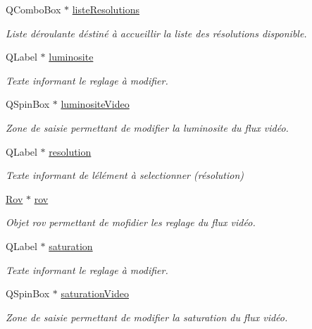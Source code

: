 \begin{DoxyCompactItemize}
Q\+Combo\+Box $\ast$ \hyperlink{class_i_h_m_reglage_video_ad897355a4350d95f5f219db57ff68d4f}{liste\+Resolutions}
\begin{DoxyCompactList}\small\item\em Liste déroulante déstiné à accueillir la liste des résolutions disponible. \end{DoxyCompactList}\item 
Q\+Label $\ast$ \hyperlink{class_i_h_m_reglage_video_a16b65877af48863d0752e226371952ab}{luminosite}
\begin{DoxyCompactList}\small\item\em Texte informant le reglage à modifier. \end{DoxyCompactList}\item 
Q\+Spin\+Box $\ast$ \hyperlink{class_i_h_m_reglage_video_a9109c0801d582917e78e57c350510ea7}{luminosite\+Video}
\begin{DoxyCompactList}\small\item\em Zone de saisie permettant de modifier la luminosite du flux vidéo. \end{DoxyCompactList}\item 
Q\+Label $\ast$ \hyperlink{class_i_h_m_reglage_video_a7fd79309e9501b8cb340ae61b96c0366}{resolution}
\begin{DoxyCompactList}\small\item\em Texte informant de l\textquotesingle{}élément à selectionner (résolution) \end{DoxyCompactList}\item 
\hyperlink{class_rov}{Rov} $\ast$ \hyperlink{class_i_h_m_reglage_video_a755736fe361e651453de6bc21725a626}{rov}
\begin{DoxyCompactList}\small\item\em Objet rov permettant de mofidier les reglage du flux vidéo. \end{DoxyCompactList}\item 
Q\+Label $\ast$ \hyperlink{class_i_h_m_reglage_video_a452450793da1908cfe89fb9984b914d1}{saturation}
\begin{DoxyCompactList}\small\item\em Texte informant le reglage à modifier. \end{DoxyCompactList}\item 
Q\+Spin\+Box $\ast$ \hyperlink{class_i_h_m_reglage_video_a058bd2a65aefa5f95ff73851f156064c}{saturation\+Video}
\begin{DoxyCompactList}\small\item\em Zone de saisie permettant de modifier la saturation du flux vidéo. \end{DoxyCompactList}\item 

\end{DoxyCompactItemize}
